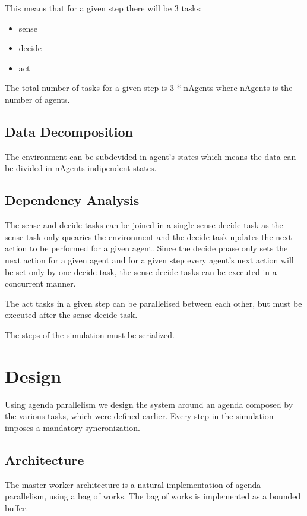 \documentclass[12pt, a4paper]{report}
\begin{document}
This means that for a given step there will be 3 tasks:
\begin{itemize}
    \item sense
    \item decide
    \item act
\end{itemize}

The total number of tasks for a given step is 3 * nAgents
 where nAgents is the number of agents.

\section{Data Decomposition}
The environment can be subdevided in agent's states which
 means the data can be divided in nAgents indipendent states.

\section{Dependency Analysis}
The sense and decide tasks can be joined in a single
 sense-decide task as the sense task only quearies the
 environment and the decide task updates the next action
 to be performed for a given agent. Since the decide phase
 only sets the next action for a given agent and for a
 given step every agent's next action will be set only
 by one decide task, the sense-decide tasks can be executed
 in a concurrent manner.

The act tasks in a given step can be parallelised between each other, but
 must be executed after the sense-decide task.

The steps of the simulation must be serialized.

\chapter{Design}
Using agenda parallelism we design the system around an agenda
 composed by the various tasks, which were defined earlier. Every
 step in the simulation imposes a mandatory syncronization.

\section{Architecture}
The master-worker architecture is a natural implementation of
 agenda parallelism, using a bag of works. The bag of works is
 implemented as a bounded buffer.
\end{document}
